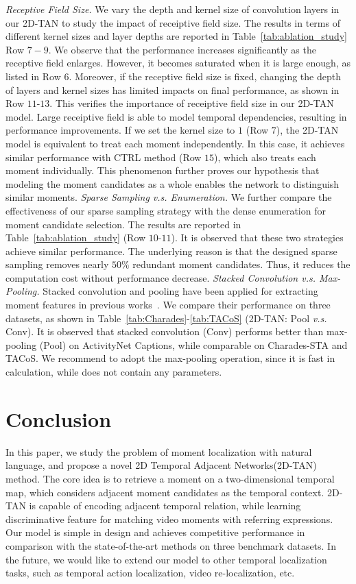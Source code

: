 \documentclass[letterpaper]{article} %
\begin{document}
\textit{Receptive Field Size. } We vary the depth and kernel size of convolution layers in our 2D-TAN to study the impact of receiptive field size.
The results in terms of different kernel sizes and layer depths are reported in Table~\ref{tab:ablation_study} Row $7-9$.
We observe that the performance increases significantly as the receptive field enlarges.
However, it becomes saturated when it is large enough, as listed in Row $6$.
Moreover, if the receptive field size is fixed, changing the depth of layers and kernel sizes has limited impacts on final performance, as shown in Row $11$-$13$.
\vspace{-3.15mm}
This verifies the importance of receiptive field size in our 2D-TAN model. Large receiptive field is able to model temporal dependencies, resulting in performance improvements.
If we set the kernel size to $1$ (Row $7$), the 2D-TAN model is equivalent to treat each moment independently. In this case, it achieves similar performance with CTRL method (Row $15$), which also treats each moment individually.
This phenomenon further proves our hypothesis that modeling the moment candidates as a whole enables the network to distinguish similar moments.  \textit{Sparse Sampling \emph{v.s.} Enumeration.}
We further compare the effectiveness of our sparse sampling strategy with the dense enumeration for moment candidate selection. The results are reported in Table~\ref{tab:ablation_study} (Row $10$-$11$). It is observed that these two strategies achieve similar performance. The underlying reason is that the designed sparse sampling removes nearly $50\%$ redundant moment candidates. Thus, it reduces the computation cost without performance decrease.  \textit{Stacked Convolution \emph{v.s.} Max-Pooling.}
Stacked convolution and pooling have been applied for extracting moment features in previous works~\cite{hendricks17iccv,zhang2019man}.
We compare their performance on three datasets, as  shown in Table~\ref{tab:Charades}-\ref{tab:TACoS} (2D-TAN: Pool \emph{v.s.} Conv).
It is observed that stacked convolution (Conv) performs better than max-pooling (Pool) on ActivityNet Captions, while comparable on Charades-STA and TACoS. We recommend to adopt the max-pooling operation, since it is fast in calculation, while does not contain any parameters.

\section{Conclusion}

In this paper, we study the problem of moment localization with natural language, and propose a novel
2D Temporal Adjacent Networks(2D-TAN) method.
The core idea is to retrieve a moment on a two-dimensional temporal map, which considers adjacent moment candidates as the temporal context. 2D-TAN is capable of encoding adjacent temporal relation, while learning discriminative feature for matching video moments with referring expressions.
Our model is simple in design and achieves  competitive performance in comparison with the state-of-the-art methods on three benchmark datasets.
In the future, we would like to extend our model to other temporal localization tasks, such as temporal action localization, video re-localization, etc.
\end{document}
